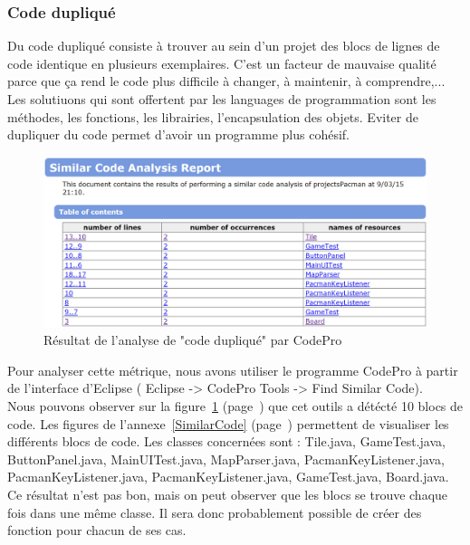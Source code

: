 \documentclass[12pt,a4paper,final]{article}
\newcommand{\annexe}[1]{annexe~\ref{#1} (page~\pageref{#1})}
\newcommand{\labelfigure}[1]{figure~\ref{#1} (page~\pageref{#1})}
\begin{document}
\subsubsection{Code dupliqué}\label{codeduplique}
Du code dupliqué consiste à trouver au sein d'un projet des blocs de lignes de code identique en plusieurs exemplaires.
C'est un facteur de mauvaise qualité parce que ça rend le code plus difficile à changer, à maintenir, à comprendre,...\\
Les solutiuons qui sont offertent par les languages de programmation sont les méthodes, les fonctions, les librairies, l'encapsulation des objets. Eviter de dupliquer du code permet d'avoir un programme plus cohésif.
\begin{figure}[!h]
	\centering
	\includegraphics[width=\textwidth]{SimilarCode_00.png}
	\caption{\label{SimilarCode0}Résultat de l'analyse de "code dupliqué" par CodePro}
\end{figure}
Pour analyser cette métrique, nous avons utiliser le programme CodePro à partir de l'interface d'Eclipse ( Eclipse -> CodePro Tools -> Find Similar Code).\\
Nous pouvons observer sur la \labelfigure{SimilarCode0} que cet outils a détécté 10 blocs de code. Les figures de l'\annexe{SimilarCode} permettent de visualiser les différents blocs de code.
Les classes concernées sont : Tile.java, GameTest.java, ButtonPanel.java, MainUITest.java, MapParser.java, PacmanKeyListener.java, PacmanKeyListener.java, PacmanKeyListener.java,  GameTest.java, Board.java.\\
Ce résultat n'est pas bon, mais on peut observer que les blocs se trouve chaque fois dans une même classe. Il sera donc probablement possible de créer des fonction pour chacun de ses cas.
\end{document}
